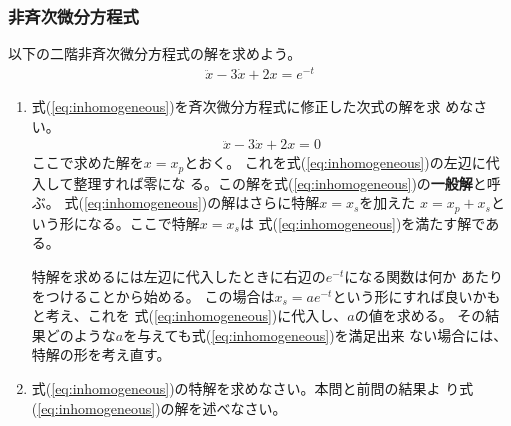 \documentclass[twocolumn,11pt]{jarticle}
\begin{document}
\subsubsection{非斉次微分方程式}
以下の二階非斉次微分方程式の解を求めよう。
\begin{align}
\label{eq:inhomogeneous}
\ddot{x}-3\dot{x}+2x=e^{-t}
\end{align}

\begin{enumerate}
\item 式(\ref{eq:inhomogeneous})を斉次微分方程式に修正した次式の解を求
  めなさい。
\begin{align}
\ddot{x}-3\dot{x}+2x=0
\end{align}
\comment ここで求めた解を$x=x_p$とおく。
  これを式(\ref{eq:inhomogeneous})の左辺に代入して整理すれば零にな
  る。この解を式(\ref{eq:inhomogeneous})の\textbf{一般解}と呼ぶ。
  式(\ref{eq:inhomogeneous})の解はさらに特解$x=x_s$を加えた
  $x=x_p+x_s$という形になる。ここで特解$x=x_s$は
  式(\ref{eq:inhomogeneous})を満たす解である。

  特解を求めるには左辺に代入したときに右辺の$e^{-t}$になる関数は何か
  あたりをつけることから始める。
  この場合は$x_s=ae^{-t}$という形にすれば良いかもと考え、これを
  式(\ref{eq:inhomogeneous})に代入し、$a$の値を求める。
  その結果どのような$a$を与えても式(\ref{eq:inhomogeneous})を満足出来
  ない場合には、特解の形を考え直す。
\item 式(\ref{eq:inhomogeneous})の特解を求めなさい。本問と前問の結果よ
  り式(\ref{eq:inhomogeneous})の解を述べなさい。
\end{enumerate}
\end{document}
